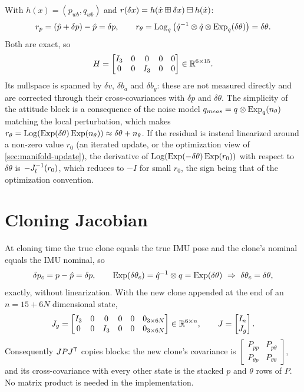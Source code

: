 With $h(x) = (p_{wb}, q_{wb})$ and $r(\delta x) = h(\hat x\boxplus\delta x)\boxminus h(\hat x)$:
\begin{equation*}
  r_p = (\hat p + \delta p) - \hat p = \delta p, \qquad
  r_\theta = \operatorname{Log}_q\big(\hat q^{-1}\otimes\hat q\otimes\operatorname{Exp}_q(\delta\theta)\big) = \delta\theta .
\end{equation*}
Both are exact, so
\begin{equation}
  H = \begin{bmatrix} I_3 & 0 & 0 & 0 & 0 \\ 0 & 0 & I_3 & 0 & 0 \end{bmatrix} \in \mathbb{R}^{6\times15}.
\end{equation}
Its nullspace is spanned by $\delta v$, $\delta b_a$ and $\delta b_g$: these are not measured directly and are corrected through their
cross-covariances with $\delta p$ and $\delta\theta$. The simplicity of the attitude block is a consequence of the noise model
$q_{meas} = q\otimes\operatorname{Exp}_q(n_\theta)$ matching the local perturbation, which makes $r_\theta = \operatorname{Log}(\operatorname{Exp}(\delta\theta)\operatorname{Exp}(n_\theta)) \approx \delta\theta + n_\theta$.
If the residual is instead linearized around a non-zero value $r_0$ (an iterated update, or the optimization view of
\cref{sec:manifold-update}), the derivative of $\operatorname{Log}(\operatorname{Exp}(-\delta\theta)\operatorname{Exp}(r_0))$ with respect to $\delta\theta$ is $-J_l^{-1}(r_0)$, which reduces to $-I$ for small
$r_0$, the sign being that of the optimization convention.

\section{Cloning Jacobian}
\label{sol:clone}

At cloning time the true clone equals the true IMU pose and the clone's nominal equals the IMU nominal, so
\begin{equation*}
  \delta p_c = p - \hat p = \delta p, \qquad \Exp(\delta\theta_c) = \hat q\inv\qprod q = \Exp(\delta\theta)\ \Rightarrow\ \delta\theta_c = \delta\theta,
\end{equation*}
exactly, without linearization. With the new clone appended at the end of an $n = 15 + 6N$ dimensional state,
\begin{equation}
  J_g = \begin{bmatrix} I_3 & 0 & 0 & 0 & 0 & 0_{3\times6N} \\ 0 & 0 & I_3 & 0 & 0 & 0_{3\times6N} \end{bmatrix}\in\mathbb{R}^{6\times n},
  \qquad J = \begin{bmatrix} I_n \\ J_g \end{bmatrix}.
\end{equation}
Consequently $JPJ^{\mathsf{T}}$ copies blocks: the new clone's covariance is
$\begin{bmatrix} P_{pp} & P_{p\theta} \\ P_{\theta p} & P_{\theta\theta}\end{bmatrix}$, and its cross-covariance with every other state is the stacked $p$ and $\theta$ rows of $P$.
No matrix product is needed in the implementation.

